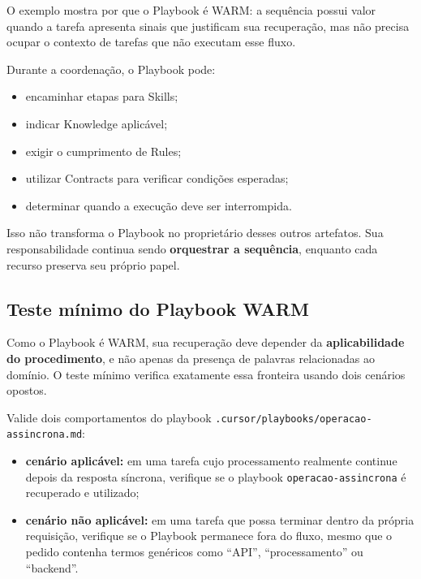\documentclass[
  10pt,
  a4paper,
  oneside]{book}
\providecommand{\tightlist}{%
  \setlength{\itemsep}{0pt}\setlength{\parskip}{0pt}}
\begin{document}
O exemplo mostra por que o Playbook é WARM: a sequência possui valor
quando a tarefa apresenta sinais que justificam sua recuperação, mas não
precisa ocupar o contexto de tarefas que não executam esse fluxo.

Durante a coordenação, o Playbook pode:

\begin{itemize}
\tightlist
\item
  encaminhar etapas para Skills;
\item
  indicar Knowledge aplicável;
\item
  exigir o cumprimento de Rules;
\item
  utilizar Contracts para verificar condições esperadas;
\item
  determinar quando a execução deve ser interrompida.
\end{itemize}

Isso não transforma o Playbook no proprietário desses outros artefatos.
Sua responsabilidade continua sendo \textbf{orquestrar a sequência},
enquanto cada recurso preserva seu próprio papel.

\hypertarget{teste-muxednimo-do-playbook-warm}{%
\subsection{Teste mínimo do Playbook
WARM}\label{teste-muxednimo-do-playbook-warm}}

Como o Playbook é WARM, sua recuperação deve depender da
\textbf{aplicabilidade do procedimento}, e não apenas da presença de
palavras relacionadas ao domínio. O teste mínimo verifica exatamente
essa fronteira usando dois cenários opostos.

Valide dois comportamentos do playbook
\texttt{.cursor/playbooks/operacao-assincrona.md}:

\begin{itemize}
\tightlist
\item
  \textbf{cenário aplicável:} em uma tarefa cujo processamento realmente
  continue depois da resposta síncrona, verifique se o playbook
  \texttt{operacao-assincrona} é recuperado e utilizado;
\item
  \textbf{cenário não aplicável:} em uma tarefa que possa terminar
  dentro da própria requisição, verifique se o Playbook permanece fora
  do fluxo, mesmo que o pedido contenha termos genéricos como ``API'',
  ``processamento'' ou ``backend''.
\end{itemize}
\end{document}
